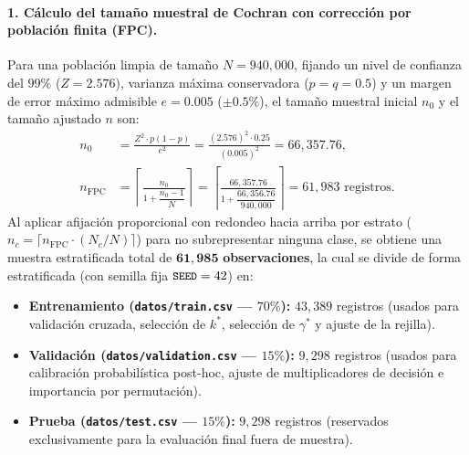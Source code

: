 \documentclass[11pt,a4paper]{article}
\newcommand{\code}[1]{\texttt{\small #1}}
\begin{document}
\paragraph{1. Cálculo del tamaño muestral de Cochran con corrección por población finita (FPC).}
Para una población limpia de tamaño $N = 940{,}000$, fijando un nivel de confianza del $99\%$ ($Z = 2.576$), varianza máxima conservadora ($p = q = 0.5$) y un margen de error máximo admisible $e = 0.005$ ($\pm 0.5\%$), el tamaño muestral inicial $n_0$ y el tamaño ajustado $n$ son:
\begin{align}
    n_0 &= \frac{Z^2 \cdot p(1 - p)}{e^2} = \frac{(2.576)^2 \cdot 0.25}{(0.005)^2} = 66{,}357.76, \\[4pt]
    n_{\text{FPC}} &= \left\lceil \frac{n_0}{1 + \dfrac{n_0 - 1}{N}} \right\rceil = \left\lceil \frac{66{,}357.76}{1 + \dfrac{66{,}356.76}{940{,}000}} \right\rceil = 61{,}983\text{ registros.}
\end{align}
Al aplicar afijación proporcional con redondeo hacia arriba por estrato ($n_c = \lceil n_{\text{FPC}} \cdot (N_c / N) \rceil$) para no subrepresentar ninguna clase, se obtiene una muestra estratificada total de $\mathbf{61{,}985}$ \textbf{observaciones}, la cual se divide de forma estratificada (con semilla fija $\text{\code{SEED}} = 42$) en:
\begin{itemize}[noitemsep]
    \item \textbf{Entrenamiento (\code{datos/train.csv} --- $70\%$):} $43{,}389$ registros (usados para validación cruzada, selección de $k^*$, selección de $\gamma^*$ y ajuste de la rejilla).
    \item \textbf{Validación (\code{datos/validation.csv} --- $15\%$):} $9{,}298$ registros (usados para calibración probabilística post-hoc, ajuste de multiplicadores de decisión e importancia por permutación).
    \item \textbf{Prueba (\code{datos/test.csv} --- $15\%$):} $9{,}298$ registros (reservados exclusivamente para la evaluación final fuera de muestra).
\end{itemize}
\end{document}
